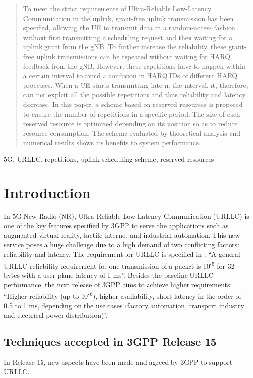 \documentclass[conference]{IEEEtran}
\begin{document}
\begin{abstract}
To meet the strict requirements of Ultra-Reliable Low-Latency Communication in the uplink, grant-free uplink transmission has been specified, allowing the UE to transmit data in a random-access fashion without first transmitting a scheduling request and then waiting for a uplink grant from the gNB. To further increase the reliability, these grant-free uplink transmissions can be repeated without waiting for HARQ feedback from the gNB. However, these repetitions have to happen within a certain interval to avoid a confusion in HARQ IDs of different HARQ processes. When a UE starts transmitting late in the interval, it, therefore, can not exploit all the possible repetitions and thus reliability and latency decrease. In this paper, a scheme based on reserved resources is proposed to ensure the number of repetitions in a specific period. The size of each reserved resource is optimized depending on its position so as to reduce resource consumption. The scheme evaluated by theoretical analysis and numerical results shows its benefits to system performance.
\end{abstract}

\begin{IEEEkeywords}
5G, URLLC, repetitions, uplink scheduling scheme, reserved resources
\end{IEEEkeywords}

\section{Introduction} \label{I}
In 5G New Radio (NR), Ultra-Reliable Low-Latency Communication (URLLC) is one of the key features specified by 3GPP to serve the applications such as augmented virtual reality, tactile internet and industrial automation. This new service poses a huge challenge due to a high demand of two conflicting factors: reliability and latency. The requirement for URLLC is specified in \cite{b6}: ``A general URLLC reliability requirement for one transmission of a packet is 10\textsuperscript{-5} for 32 bytes with a user plane latency of 1 ms''. Besides the baseline URLLC performance, the next release of 3GPP aims to achieve higher requirements: ``Higher reliability (up to 10\textsuperscript{-6}), higher availability, short latency in the order of 0.5 to 1 ms, depending on the use cases (factory automation, transport industry and electrical power distribution)''\cite{b8}.

\subsection{Techniques accepted in 3GPP Release 15}\label{IAA}
In Release 15, new aspects have been made and agreed by 3GPP to support URLLC. 
\end{document}
